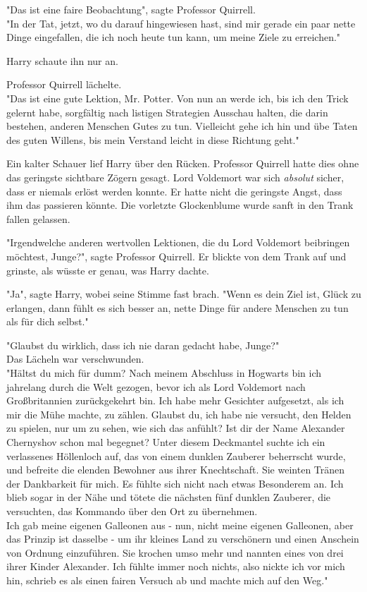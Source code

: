 {"Das ist eine faire Beobachtung", sagte Professor Quirrell.\\ "In der Tat, jetzt, wo du darauf hingewiesen hast, sind mir gerade ein paar nette Dinge eingefallen, die ich noch heute tun kann, um meine Ziele zu erreichen."

Harry schaute ihn nur an.

Professor Quirrell lächelte.\\ "Das ist eine gute Lektion, Mr. Potter. Von nun an werde ich, bis ich den Trick gelernt habe, sorgfältig nach listigen Strategien Ausschau halten, die darin bestehen, anderen Menschen Gutes zu tun. Vielleicht gehe ich hin und übe Taten des guten Willens, bis mein Verstand leicht in diese Richtung geht."

Ein kalter Schauer lief Harry über den Rücken. Professor Quirrell hatte dies ohne das geringste sichtbare Zögern gesagt. Lord Voldemort war sich \emph{absolut} sicher, dass er niemals erlöst werden konnte. Er hatte nicht die geringste Angst, dass ihm das passieren könnte. Die vorletzte Glockenblume wurde sanft in den Trank fallen gelassen.

"Irgendwelche anderen wertvollen Lektionen, die du Lord Voldemort beibringen möchtest, Junge?", sagte Professor Quirrell. Er blickte von dem Trank auf und grinste, als wüsste er genau, was Harry dachte.

"Ja", sagte Harry, wobei seine Stimme fast brach. "Wenn es dein Ziel ist, Glück zu erlangen, dann fühlt es sich besser an, nette Dinge für andere Menschen zu tun als für dich selbst."

"Glaubst du wirklich, dass ich nie daran gedacht habe, Junge?"\\ Das Lächeln war verschwunden.\\ "Hältst du mich für dumm? Nach meinem Abschluss in Hogwarts bin ich jahrelang durch die Welt gezogen, bevor ich als Lord Voldemort nach Großbritannien zurückgekehrt bin. Ich habe mehr Gesichter aufgesetzt, als ich mir die Mühe machte, zu zählen. Glaubst du, ich habe nie versucht, den Helden zu spielen, nur um zu sehen, wie sich das anfühlt? Ist dir der Name Alexander Chernyshov schon mal begegnet? Unter diesem Deckmantel suchte ich ein verlassenes Höllenloch auf, das von einem dunklen Zauberer beherrscht wurde, und befreite die elenden Bewohner aus ihrer Knechtschaft. Sie weinten Tränen der Dankbarkeit für mich. Es fühlte sich nicht nach etwas Besonderem an. Ich blieb sogar in der Nähe und tötete die nächsten fünf dunklen Zauberer, die versuchten, das Kommando über den Ort zu übernehmen.\\ Ich gab meine eigenen Galleonen aus - nun, nicht meine eigenen Galleonen, aber das Prinzip ist dasselbe - um ihr kleines Land zu verschönern und einen Anschein von Ordnung einzuführen. Sie krochen umso mehr und nannten eines von drei ihrer Kinder Alexander. Ich fühlte immer noch nichts, also nickte ich vor mich hin, schrieb es als einen fairen Versuch ab und machte mich auf den Weg."

}
